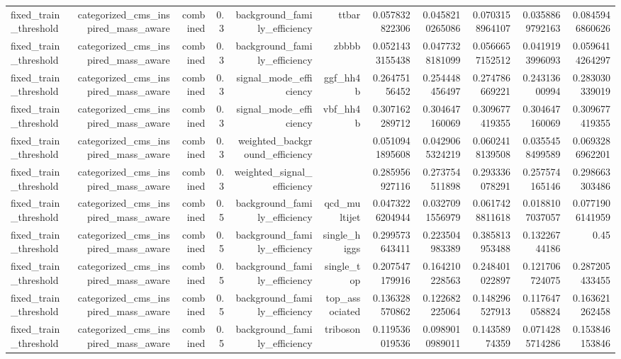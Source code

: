 \begin{table}[htbp]
{\begin{tabular}{lrrrrrrrrrr}
fixed\_train\_threshold & categorized\_cms\_inspired\_mass\_aware & combined & 0.3 & background\_family\_efficiency & ttbar & 0.057832822306 & 0.0458210265086 & 0.0703158964107 & 0.0358869792163 & 0.0845946860626 \\
fixed\_train\_threshold & categorized\_cms\_inspired\_mass\_aware & combined & 0.3 & background\_family\_efficiency & zbbbb & 0.0521433155438 & 0.0477328181099 & 0.0566657152512 & 0.0419193996093 & 0.0596414264297 \\
fixed\_train\_threshold & categorized\_cms\_inspired\_mass\_aware & combined & 0.3 & signal\_mode\_efficiency & ggf\_hh4b & 0.26475156452 & 0.254448456497 & 0.274786669221 & 0.24313600994 & 0.283030339019 \\
fixed\_train\_threshold & categorized\_cms\_inspired\_mass\_aware & combined & 0.3 & signal\_mode\_efficiency & vbf\_hh4b & 0.307162289712 & 0.304647160069 & 0.309677419355 & 0.304647160069 & 0.309677419355 \\
fixed\_train\_threshold & categorized\_cms\_inspired\_mass\_aware & combined & 0.3 & weighted\_background\_efficiency &  & 0.0510941895608 & 0.0429065324219 & 0.0602418139508 & 0.0355458499589 & 0.0693286962201 \\
fixed\_train\_threshold & categorized\_cms\_inspired\_mass\_aware & combined & 0.3 & weighted\_signal\_efficiency &  & 0.285956927116 & 0.273754511898 & 0.293336078291 & 0.257574165146 & 0.298663303486 \\
fixed\_train\_threshold & categorized\_cms\_inspired\_mass\_aware & combined & 0.5 & background\_family\_efficiency & qcd\_multijet & 0.0473226204944 & 0.0327091556979 & 0.0617428811618 & 0.0188107037057 & 0.0771906141959 \\
fixed\_train\_threshold & categorized\_cms\_inspired\_mass\_aware & combined & 0.5 & background\_family\_efficiency & single\_higgs & 0.299573643411 & 0.223504983389 & 0.385813953488 & 0.13226744186 & 0.45 \\
fixed\_train\_threshold & categorized\_cms\_inspired\_mass\_aware & combined & 0.5 & background\_family\_efficiency & single\_top & 0.207547179916 & 0.164210228563 & 0.248401022897 & 0.121706724075 & 0.287205433455 \\
fixed\_train\_threshold & categorized\_cms\_inspired\_mass\_aware & combined & 0.5 & background\_family\_efficiency & top\_associated & 0.136328570862 & 0.122682225064 & 0.148296527913 & 0.117647058824 & 0.163621262458 \\
fixed\_train\_threshold & categorized\_cms\_inspired\_mass\_aware & combined & 0.5 & background\_family\_efficiency & triboson & 0.119536019536 & 0.0989010989011 & 0.14358974359 & 0.0714285714286 & 0.153846153846 \\

\end{tabular}}
\end{table}
